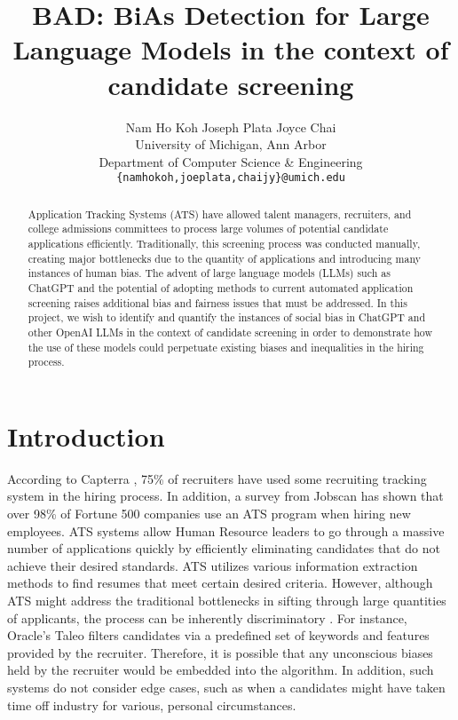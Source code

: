 \documentclass{article}
\title{BAD: BiAs Detection for Large Language Models in the context of candidate screening}
\author{Nam Ho Koh \quad Joseph Plata \quad Joyce Chai\\
University of Michigan, Ann Arbor\\
Department of Computer Science \& Engineering\\
\texttt{\{namhokoh,joeplata,chaijy\}@umich.edu}\\
}
\begin{document}
\maketitle


\begin{abstract}
Application Tracking Systems (ATS) have allowed talent managers, recruiters, and college admissions committees to process large volumes of potential candidate applications efficiently. Traditionally, this screening process was conducted manually, creating major bottlenecks due to the quantity of applications and introducing many instances of human bias. The advent of large language models (LLMs) such as ChatGPT and the potential of adopting methods to current automated application screening raises additional bias and fairness issues that must be addressed. In this project, we wish to identify and quantify the instances of social bias in ChatGPT and other OpenAI LLMs in the context of candidate screening in order to demonstrate how the use of these models could perpetuate existing biases and inequalities in the hiring process.
\end{abstract}


\section{Introduction}

According to Capterra \cite{Capterra}, 75\% of recruiters have used some recruiting tracking system in the hiring process. In addition, a survey from Jobscan \cite{Inc.} has shown that over 98\% of Fortune 500 companies use an ATS program when hiring new employees. ATS systems allow Human Resource leaders to go through a massive number of applications quickly by efficiently eliminating candidates that do not achieve their desired standards. ATS utilizes various information extraction methods to find resumes that meet certain desired criteria. However, although ATS might address the traditional bottlenecks in sifting through large quantities of applicants, the process can be inherently discriminatory \cite{Inc.}. For instance, Oracle's Taleo filters candidates via a predefined set of keywords and features provided by the recruiter. Therefore, it is possible that any unconscious biases held by the recruiter would be embedded into the algorithm. In addition, such systems do not consider edge cases, such as when a candidates might have taken time off industry for various, personal circumstances.
\end{document}
